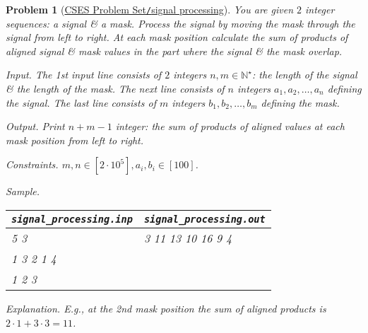 \documentclass{article}
\newtheorem{problem}{Problem}
\begin{document}
\begin{problem}[\href{https://cses.fi/problemset/task/2113}{CSES Problem Set{\tt/}signal processing}]
    You are given $2$ integer sequences: a signal \& a mask. Process the signal by moving the mask through the signal from left to right. At each mask position calculate the sum of products of aligned signal \& mask values in the part where the signal \& the mask overlap.
    \item {\sf Input.} The 1st input line consists of $2$ integers $n,m\in\mathbb{N}^\star$: the length of the signal \& the length of the mask. The next line consists of $n$ integers $a_1,a_2,\ldots,a_n$ defining the signal. The last line consists of $m$ integers $b_1,b_2,\ldots,b_m$ defining the mask.
    \item {\sf Output.} Print $n + m - 1$ integer: the sum of products of aligned values at each mask position from left to right.
    \item {\sf Constraints.} $m,n\in[2\cdot10^5],a_i,b_i\in[100]$.
    \item {\sf Sample.}
    \begin{table}[H]
        \centering
        \begin{tabular}{|l|l|}
            \hline
            \verb|signal_processing.inp| & \verb|signal_processing.out| \\
            \hline
            5 3 & 3 11 13 10 16 9 4 \\
            1 3 2 1 4 & \\
            1 2 3 & \\
            \hline
        \end{tabular}
    \end{table}
    \item {\sf Explanation.} E.g., at the 2nd mask position the sum of aligned products is $2\cdot1 + 3\cdot3 = 11$.
\end{problem}
\end{document}
